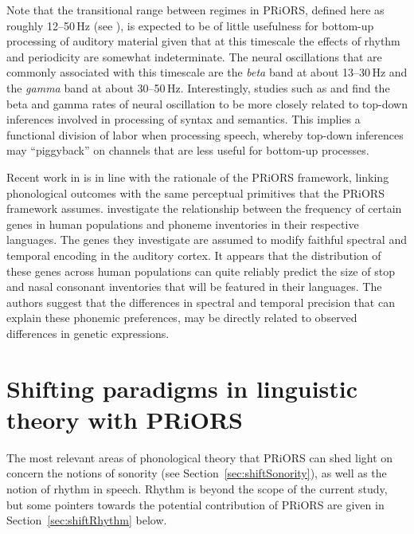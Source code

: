 Note that the transitional range between regimes in PRiORS, defined here as roughly 12--50\,Hz (see ), is expected to be of little usefulness for bottom-up processing of auditory material given that at this timescale the effects of rhythm and periodicity are somewhat indeterminate.
The neural oscillations that are commonly associated with this timescale are the \emph{beta} band at about 13--30\,Hz and the \emph{gamma} band at about 30--50\,Hz.
Interestingly, studies such as \citet{mai2016deltask} and \citet{keitel2018perceptually} find the beta and gamma rates of neural oscillation to be more closely related to top-down inferences involved in processing of syntax and semantics. This implies a functional division of labor when processing speech, whereby top-down inferences may \enquote{piggyback} on channels that are less useful for bottom-up processes.


Recent work in \citet{tang2020dcdc2sk} is in line with the rationale of the PRiORS framework, linking phonological outcomes with the same perceptual primitives that the PRiORS framework assumes. \citet{tang2020dcdc2sk} investigate the relationship between the frequency of certain genes in human populations and phoneme inventories in their respective languages.
The genes they investigate are assumed to modify faithful spectral and temporal encoding in the auditory cortex. It appears that the distribution of these genes across human populations can quite reliably predict the size of stop and nasal consonant inventories that will be featured in their languages. The authors suggest that the differences in spectral and temporal precision that can explain these phonemic preferences, may be directly related to observed differences in genetic expressions.

\section{Shifting paradigms in linguistic theory with PRiORS}\label{sec:shiftPar}\largerpage

The most relevant areas of phonological theory that PRiORS can shed light on concern the notions of sonority (see Section~\ref{sec:shiftSonority}), as well as the notion of rhythm in speech. Rhythm is beyond the scope of the current study, but some pointers towards the potential contribution of PRiORS are given in Section~\ref{sec:shiftRhythm} below.

